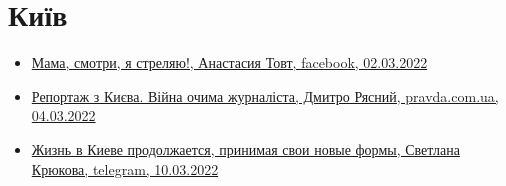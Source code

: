  
 
 
 
 

\section{Київ}
\label{sec:topics.vojna.kiev}

\begin{itemize} %
\item \hyperlink{02_03_2022.fb.tovt_anastasia.1.mama_smotri_ja_streljaju}{%
Мама, смотри, я стреляю!, Анастасия Товт, facebook, 02.03.2022%
}

\item \hyperlink{04_03_2022.stz.news.ua.pravda.1.reportazh_z_kieva}{%
Репортаж з Києва. Війна очима журналіста, Дмитро Рясний, pravda.com.ua, 04.03.2022%
}

\item \hyperlink{10_03_2022.tg.krjukova_svetlana.1.zhizn_v_kieve}{%
Жизнь в Киеве продолжается, принимая свои новые формы, Светлана Крюкова, telegram, 10.03.2022
}

\end{itemize} %
